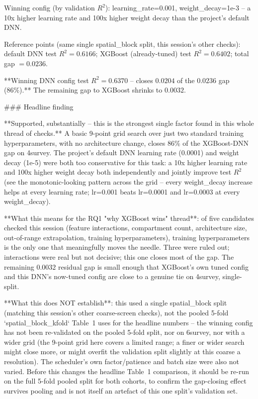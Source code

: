 Winning config (by validation $R^2$): learning\_rate=0.001, weight\_decay=1e-3 -- a 10x higher
learning rate and 100x higher weight decay than the project's default DNN.

Reference points (same single spatial\_block split, this session's other checks): default DNN
test $R^2=0.6166$; XGBoost (already-tuned) test $R^2=0.6402$; total gap $=0.0236$.

**Winning DNN config test $R^2=0.6370$ -- closes $0.0204$ of the $0.0236$ gap (86\%).** The
remaining gap to XGBoost shrinks to $0.0032$.

### Headline finding

**Supported, substantially -- this is the strongest single factor found in this whole thread of
checks.** A basic 9-point grid search over just two standard training hyperparameters, with no
architecture change, closes 86\% of the XGBoost-DNN gap on 4survey. The project's default DNN
learning rate (0.0001) and weight decay (1e-5) were both too conservative for this task: a 10x
higher learning rate and 100x higher weight decay both independently and jointly improve test
$R^2$ (see the monotonic-looking pattern across the grid -- every weight\_decay increase helps at
every learning rate; lr=0.001 beats lr=0.0001 and lr=0.0003 at every weight\_decay).

**What this means for the RQ1 "why XGBoost wins" thread**: of five candidates checked this
session (feature interactions, compartment count, architecture size, out-of-range extrapolation,
training hyperparameters), training hyperparameters is the only one that meaningfully moves the
needle. Three were ruled out; interactions were real but not decisive; this one closes most of the
gap. The remaining $0.0032$ residual gap is small enough that XGBoost's own tuned config and this
DNN's now-tuned config are close to a genuine tie on 4survey, single-split.

**What this does NOT establish**: this used a single spatial\_block split (matching this session's
other coarse-screen checks), not the pooled 5-fold `spatial_block_kfold` Table~1 uses for the
headline numbers -- the winning config has not been re-validated on the pooled 5-fold split, nor
on 6survey, nor with a wider grid (the 9-point grid here covers a limited range; a finer or wider
search might close more, or might overfit the validation split slightly at this coarse a
resolution). The scheduler's own factor/patience and batch size were also not varied. Before this
changes the headline Table~1 comparison, it should be re-run on the full 5-fold pooled split for
both cohorts, to confirm the gap-closing effect survives pooling and is not itself an artefact of
this one split's validation set.
